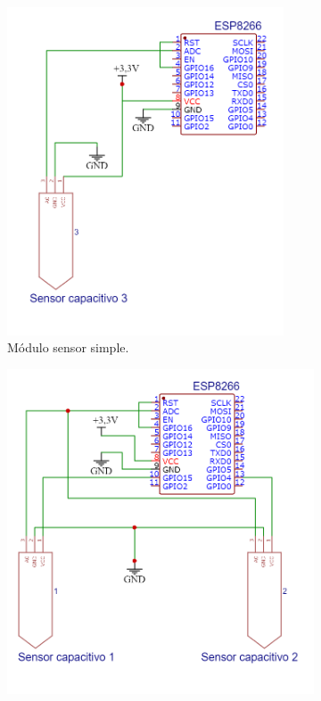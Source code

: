 \begin{figure}[!h]
     \centering
     \begin{subfigure}[b]{0.45\textwidth}
		\centering
		\includegraphics[width=0.9\textwidth]{./Figures/soil_schem_simple.png}
		\caption[Módulo sensor simple]{Módulo sensor simple.}
		\label{fig:soilschem1}
     \end{subfigure}
     \hfill
     \begin{subfigure}[b]{0.45\textwidth}
	\centering
		\includegraphics[width=1\textwidth]{./Figures/soil_schem_doble.png}

\end{subfigure}
\end{figure}
